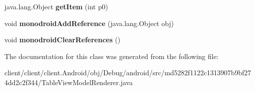 \begin{DoxyCompactItemize}
\item 
\hypertarget{classmd5282f1122c1313907b9bf274dd2c2f344_1_1TableViewModelRenderer_a464b2dbf266bcadc2777b99a00f05048}{}java.\+lang.\+Object {\bfseries get\+Item} (int p0)\label{classmd5282f1122c1313907b9bf274dd2c2f344_1_1TableViewModelRenderer_a464b2dbf266bcadc2777b99a00f05048}

\item 
\hypertarget{classmd5282f1122c1313907b9bf274dd2c2f344_1_1TableViewModelRenderer_a947a5346569980eb6fedfe4e689bb03d}{}void {\bfseries monodroid\+Add\+Reference} (java.\+lang.\+Object obj)\label{classmd5282f1122c1313907b9bf274dd2c2f344_1_1TableViewModelRenderer_a947a5346569980eb6fedfe4e689bb03d}

\item 
\hypertarget{classmd5282f1122c1313907b9bf274dd2c2f344_1_1TableViewModelRenderer_a05b4d251839ea22eab93b6851a3cdbe7}{}void {\bfseries monodroid\+Clear\+References} ()\label{classmd5282f1122c1313907b9bf274dd2c2f344_1_1TableViewModelRenderer_a05b4d251839ea22eab93b6851a3cdbe7}

\end{DoxyCompactItemize}


The documentation for this class was generated from the following file\+:\begin{DoxyCompactItemize}
\item 
client/client/client.\+Android/obj/\+Debug/android/src/md5282f1122c1313907b9bf274dd2c2f344/Table\+View\+Model\+Renderer.\+java\end{DoxyCompactItemize}
